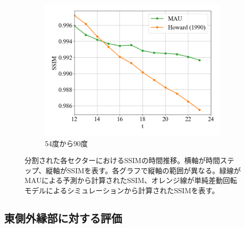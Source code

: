 \begin{figure}[htbp]
            \begin{subfigure}{0.5\textwidth}
              \centering
              \includegraphics[width=\textwidth]{figures/exp2/lng_ssim_5.png}
              \caption{54度から90度}
            \end{subfigure}
          \label{fig:exp2_ssim}
          \caption{分割された各セクターにおけるSSIMの時間推移。横軸が時間ステップ、縦軸がSSIMを表す。各グラフで縦軸の範囲が異なる。緑線がMAUによる予測から計算されたSSIM、オレンジ線が単純差動回転モデルによるシミュレーションから計算されたSSIMを表す。}
        \end{figure}


    \subsection{東側外縁部に対する評価}
